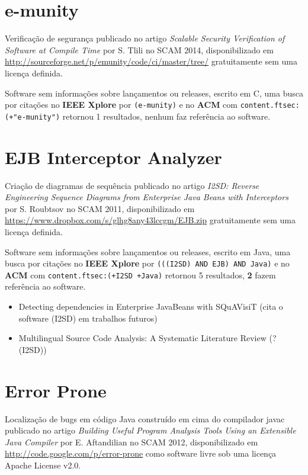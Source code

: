 \section{e-munity}

Verificação de segurança
publicado no artigo {\it Scalable Security Verification of Software at Compile Time}
por S. Tlili
no SCAM 2014,
disponibilizado em \url{http://sourceforge.net/p/emunity/code/ci/master/tree/}
gratuitamente
sem uma licença definida.

Software sem informações sobre lançamentos ou releases,
escrito em C,
uma busca por citações no {\bf IEEE Xplore} por
\texttt{(e-munity)}
e no {\bf ACM} com
\texttt{content.ftsec:(+"e-munity")}
retornou
1 resultados,
nenhum faz referência ao software.


\section{EJB Interceptor Analyzer}

Criação de diagramas de sequência
publicado no artigo {\it I2SD: Reverse Engineering Sequence Diagrams from Enterprise Java Beans with Interceptors}
por S. Roubtsov
no SCAM 2011,
disponibilizado em \url{https://www.dropbox.com/s/glhg8any43lccgm/EJB.zip}
gratuitamente
sem uma licença definida.

Software sem informações sobre lançamentos ou releases,
escrito em Java,
uma busca por citações no {\bf IEEE Xplore} por
\texttt{(((I2SD) AND EJB) AND Java)}
e no {\bf ACM} com
\texttt{content.ftsec:(+I2SD +Java)}
retornou
5 resultados,
{\bf 2} fazem referência ao software.

\begin{itemize}
\item Detecting dependencies in Enterprise JavaBeans with SQuAVisiT (cita o software (I2SD) em trabalhos futuros)
\item Multilingual Source Code Analysis: A Systematic Literature Review (? (I2SD))
\end{itemize}

\section{Error Prone}

Localização de bugs em código Java construído em cima do compilador javac
publicado no artigo {\it Building Useful Program Analysis Tools Using an Extensible Java Compiler}
por E. Aftandilian
no SCAM 2012,
disponibilizado em \url{http://code.google.com/p/error-prone}
como software livre
sob uma licença Apache License v2.0.


